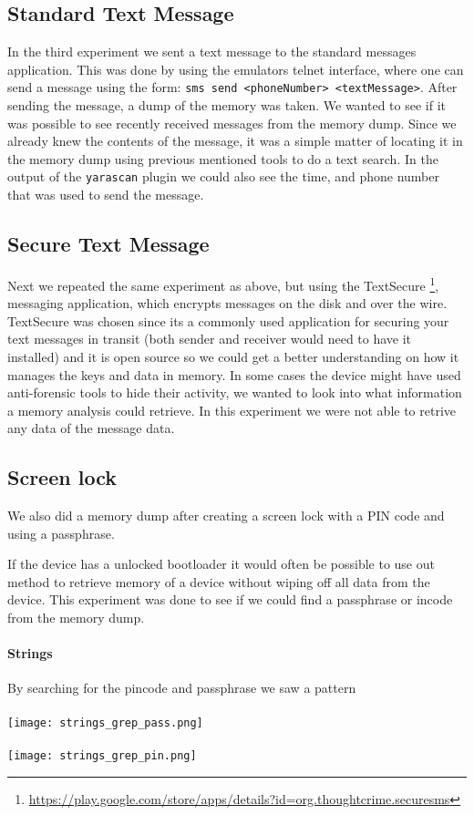 \subsection{Standard Text Message}
In the third experiment we sent a text message to the standard messages application.
This was done by using the emulators telnet interface, where one can send a message
using the form: \texttt{sms send <phoneNumber> <textMessage>}. After sending the
message, a dump of the memory was taken. We wanted to see if it was possible to 
see recently received messages from the memory dump. Since we already knew the 
contents of the message, it was a simple matter of locating it in the memory 
dump using previous mentioned tools to do a text search. In the output of the
\texttt{yarascan} plugin we could also see the time, and phone number that was
used to send the message.
  
\subsection{Secure Text Message}
Next we repeated the same experiment as above, but using the TextSecure
\footnote{\url{https://play.google.com/store/apps/details?id=org.thoughtcrime.securesms}}, 
messaging application, which encrypts messages on the disk and over the wire.
TextSecure was chosen since its a commonly used application for securing your 
text messages in transit (both sender and receiver would need to have it 
installed) and it is open source so we could get a better understanding on 
how it manages the keys and data in memory.  
In some cases the device might have used anti-forensic tools to hide their 
activity, we wanted to look into what information a memory analysis could 
retrieve. In this experiment we were not able to retrive any data of the message 
data.


\subsection{Screen lock}
We also did a memory dump after creating a screen lock with a PIN code and using a passphrase.
  
If the device has a unlocked bootloader it would often be possible to use out 
method to retrieve memory of a device without wiping off all data from the 
device. This experiment was done to see if we could find a passphrase or 
incode from the memory dump.

  \paragraph{Strings}
  By searching for the pincode and passphrase we saw a pattern 
  \\
  \\
  \texttt{[image: strings\_grep\_pass.png]}\\
  \\
  \texttt{[image: strings\_grep\_pin.png]}
